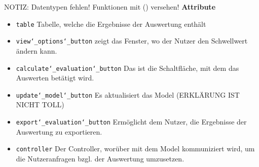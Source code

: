 \documentclass{article}
\begin{document}
NOTIZ: Datentypen fehlen! Funktionen mit () versehen!
\textbf{{Attribute}}
\begin{itemize}
\item \texttt{table} \newline Tabelle, welche die Ergebnisse der Auswertung enthält
\item \texttt{view\char`_options\char`_button} \newline zeigt das Fenster, wo der Nutzer den Schwellwert ändern kann.
\item \texttt{calculate\char`_evaluation\char`_button} \newline Das ist die Schaltfläche, mit dem das Auswerten betätigt wird.
\item \texttt{update\char`_model\char`_button} \newline Es aktualisiert das Model (ERKLÄRUNG IST NICHT TOLL)
\item \texttt{export\char`_evaluation\char`_button} \newline Ermöglicht dem Nutzer, die Ergebnisse der Auswertung zu exportieren.
\item \texttt{controller} \newline Der Controller, worüber mit dem Model kommuniziert wird, um die Nutzeranfragen bzgl. der Auswertung umzusetzen.
\end{itemize}
\end{document}

